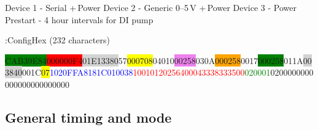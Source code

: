 Device 1 - Serial +\,Power\newline
Device 2 - Generic 0--5\,V +\,Power\newline
Device 3 - Power\newline
Prestart - 4 hour intervals for DI pump\newline

\clearpage

:ConfigHex (232 characters)

\colorbox{green}{CAB39E84}\colorbox{red}{000000F4}\colorbox{lightgray}{01E13380}57\colorbox{yellow}{000708}04010\colorbox{violet}{00258}030A\colorbox{orange}{000258}0017\colorbox{green}{000258}011A\colorbox{lightgray}{003840}001\newline C\colorbox{yellow}{07}\textcolor{blue}{1020FFA8181C010038}\textcolor{red}{10010120256400043338333500}\textcolor{green}{020001}0200000000000000000000000


\subsection*{General timing and mode}

